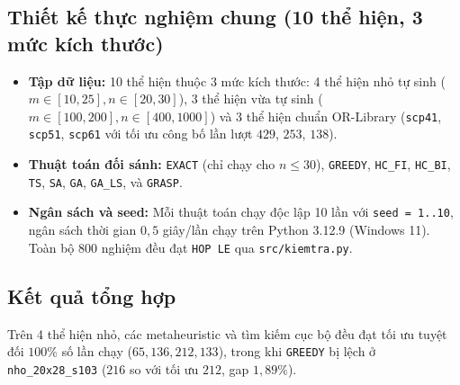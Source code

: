 \subsection{Thiết kế thực nghiệm chung (10 thể hiện, 3 mức kích thước)}
\begin{itemize}
 \item \textbf{Tập dữ liệu:} 10 thể hiện thuộc 3 mức kích thước: 4 thể hiện nhỏ tự sinh ($m \in [10, 25], n \in [20, 30]$), 3 thể hiện vừa tự sinh ($m \in [100, 200], n \in [400, 1000]$) và 3 thể hiện chuẩn OR-Library (\texttt{scp41}, \texttt{scp51}, \texttt{scp61} với tối ưu công bố lần lượt $429$, $253$, $138$).
 \item \textbf{Thuật toán đối sánh:} \texttt{EXACT} (chỉ chạy cho $n \le 30$), \texttt{GREEDY}, \texttt{HC\_FI}, \texttt{HC\_BI}, \texttt{TS}, \texttt{SA}, \texttt{GA}, \texttt{GA\_LS}, và \texttt{GRASP}.
 \item \textbf{Ngân sách và seed:} Mỗi thuật toán chạy độc lập 10 lần với \texttt{seed = 1..10}, ngân sách thời gian $0{,}5$ giây/lần chạy trên Python 3.12.9 (Windows 11). Toàn bộ 800 nghiệm đều đạt \texttt{HOP LE} qua \texttt{src/kiemtra.py}.
\end{itemize}

\subsection{Kết quả tổng hợp}
Trên 4 thể hiện nhỏ, các metaheuristic và tìm kiếm cục bộ đều đạt tối ưu tuyệt đối $100\%$ số lần chạy ($65, 136, 212, 133$), trong khi \texttt{GREEDY} bị lệch ở \texttt{nho\_20x28\_s103} ($216$ so với tối ưu $212$, gap $1{,}89\%$).

